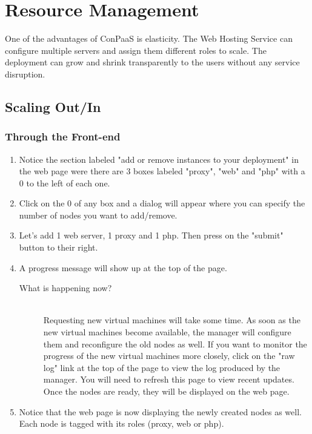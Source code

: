\documentclass[12pt]{article}
\newenvironment{what}
{\begin{description} \item [What is happening now?] \hfill \\}
{\end{description}}
\begin{document}
\section{Resource Management}
One of the advantages of ConPaaS is elasticity. The Web Hosting Service can
configure multiple servers and assign them different roles to scale. The
deployment can grow and shrink transparently to the users without any
service disruption.

\subsection{Scaling Out/In}
\subsubsection{Through the Front-end}
\begin{enumerate}
\item Notice the section labeled "add or remove instances to your deployment" in
      the web page were there are 3 boxes labeled "proxy", "web" and "php" with
      a 0 to the left of each one.
\item Click on the 0 of any box and a dialog will appear where you can specify
the number of nodes you want to add/remove.
\item Let's add 1 web server, 1 proxy and 1 php. Then press on the "submit"
      button to their right.
\item A progress message will show up at the top of the page.
 \begin{what}
  Requesting new virtual machines will take some time. As soon as the new
  virtual machines become available, the manager will configure them and
  reconfigure the old nodes as well. If you want to monitor the progress of the
  new virtual machines more closely, click on the "raw log" link at the top of
  the page to view the log produced by the manager. You will need to refresh
  this page to view recent updates. Once the nodes are ready, they will be
  displayed on the web page.
 \end{what}
\item Notice that the web page is now displaying the newly created nodes as
      well. Each node is tagged with its roles (proxy, web or php).
\end{enumerate}
\end{document}
